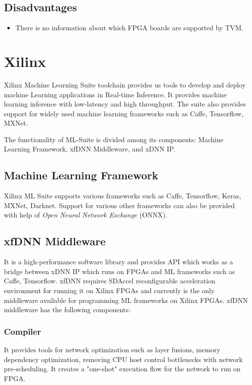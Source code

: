 \documentclass[titlepage]{report}
\begin{document}
 \subsection{Disadvantages}
 \begin{itemize}
 \item There is no information about which FPGA boards are supported by TVM.
 \end{itemize}

\section{Xilinx}
Xilinx Machine Learning Suite toolchain provides us tools to develop and deploy machine Learning applications in Real-time Inference. It provides machine learning inference with low-latency and high throughput. The suite also provides support for widely used machine learning frameworks such as Caffe, Tensorflow, MXNet.

The functionality of ML-Suite is divided among its components: Machine Learning Framework, xfDNN Middleware, and xDNN IP.

\subsection{Machine Learning Framework}
Xilinx ML Suite supports various frameworks such as Caffe, Tensorflow, Keras, MXNet, Darknet. Support for various other frameworks can also be provided with help of \textit{Open Neural Network Exchange} (ONNX).

\subsection{xfDNN Middleware}
It is a high-performance software library and provides API which works as a bridge between xDNN IP which runs on FPGAs and ML frameworks such as Caffe, Tensorflow. xfDNN requires SDAccel reconfigurable acceleration environment for running it on Xilinx FPGAs and currently is the only middleware available for programming ML frameworks on Xilinx FPGAs. xfDNN middleware has the following components:
\subsubsection{Compiler}

It provides tools for network optimization such as layer fusions, memory dependency optimization, removing CPU host control bottlenecks with network pre-scheduling. It creates a "one-shot" execution flow for the network to run on FPGA.
\end{document}

